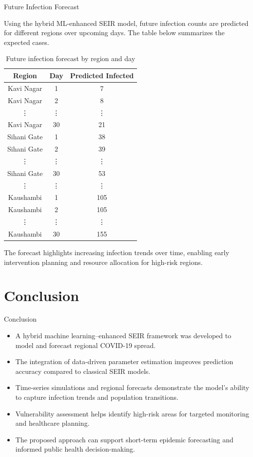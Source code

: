 \documentclass{beamer}
\begin{document}
\begin{frame}{Future Infection Forecast}

\tiny{Using the hybrid ML-enhanced SEIR model, future infection counts are predicted
for different regions over upcoming days. The table below summarizes the expected cases.}

\begin{table}
\centering
\begin{tabular}{|c|c|c|}
\hline
Region & Day & Predicted Infected \\
\hline
Kavi Nagar & 1  & 7 \\
Kavi Nagar & 2  & 8 \\
\vdots & \vdots & \vdots\\
Kavi Nagar & 30 & 21 \\
\hline
Sihani Gate & 1  & 38 \\
Sihani Gate & 2  & 39 \\
\vdots & \vdots & \vdots\\
Sihani Gate & 30 & 53 \\
\hline
\vdots & \vdots & \vdots\\
\hline
Kaushambi & 1  & 105 \\
Kaushambi & 2  & 105 \\
\vdots & \vdots & \vdots\\
Kaushambi & 30 & 155 \\
\hline
\end{tabular}
\caption{Future infection forecast by region and day}
\end{table}

\vspace{0.2cm}
\tiny{The forecast highlights increasing infection trends over time, enabling early
intervention planning and resource allocation for high-risk regions.}

\end{frame}

\section{Conclusion}
\begin{frame}{Conclusion}

\begin{itemize}
\item A hybrid machine learning–enhanced SEIR framework was developed to model and forecast regional COVID-19 spread.
\item The integration of data-driven parameter estimation improves prediction accuracy compared to classical SEIR models.
\item Time-series simulations and regional forecasts demonstrate the model’s ability to capture infection trends and population transitions.
\item Vulnerability assessment helps identify high-risk areas for targeted monitoring and healthcare planning.
\item The proposed approach can support short-term epidemic forecasting and informed public health decision-making.
\end{itemize}

\end{frame}
\end{document}
